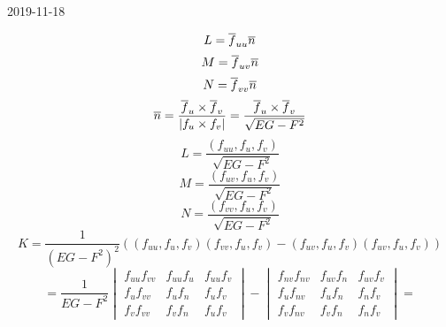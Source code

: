 \documentclass[main]{subfiles}
\begin{document}
\begin{lect}{2019-11-18}
    \begin{Proof}[теоремы]
      \[L = \overline{f}_{uu} \overline{n}\]
      \[M = \overline{f}_{uv} \overline{n}\]
      \[N = \overline{f}_{vv} \overline{n}\]
      \[\overline{n} = \frac{\overline{f}_u \times \overline{f}_v}{|f_u \times f_v|} = \frac{\overline{f}_u \times \overline{f}_v}{\sqrt{EG - F^2}}\]
      \[L = \frac{(f_{uu}, f_u, f_v)}{\sqrt{EG - F^2}}\]
      \[M = \frac{(f_{uv}, f_u, f_v)}{\sqrt{EG - F^2}}\]
      \[N = \frac{(f_{vv}, f_u, f_v)}{\sqrt{EG - F^2}}\]
      \[K = \frac{1}{(EG - F^2)^2} ( (f_{uu}, f_u, f_v)(f_{vv}, f_u, f_v) - (f_{uv}, f_u, f_v)(f_{uv}, f_u, f_v) )\]
      \[= \frac{1}{EG - F^2} \begin{vmatrix}
        f_{uu}f_{vv} & f_{uu}f_{u} & f_{uu}f_{v}\\
        f_{u}f_{vv} & f_{u}f_{n} & f_{u}f_{v}\\
        f_{v}f_{vv} & f_{v}f_{n} & f_{u}f_{v}
      \end{vmatrix} - \begin{vmatrix}
        f_{nv}f_{nv} & f_{uv}f_{n} & f_{uv}f_{v}\\
        f_{u}f_{nv} & f_{u}f_{n} & f_{n}f_{v}\\
        f_{v}f_{nv} & f_{v}f_{n} & f_{n}f_{v}
      \end{vmatrix} =\]


\end{Proof}
\end{lect}
\end{document}
